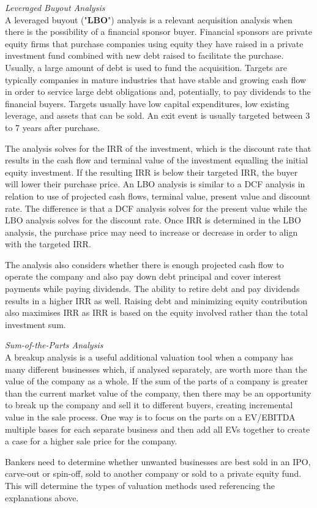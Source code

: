 \documentclass[10pt, a4paper]{article}
\begin{document}
\vspace{10pt}
\noindent \textit{Leveraged Buyout Analysis}\\
A leveraged buyout ("\textbf{LBO}") analysis is a relevant acquisition analysis when there is the possibility of a financial sponsor buyer. Financial sponsors are private equity firms that purchase companies using equity they have raised in a private investment fund combined with new debt raised to facilitate the purchase. Usually, a large amount of debt is used to fund the acquisition. Targets are typically companies in mature industries that have stable and growing cash flow in order to service large debt obligations and, potentially, to pay dividends to the financial buyers. Targets usually have low capital expenditures, low existing leverage, and assets that can be sold. An exit event is usually targeted between 3 to 7 years after purchase.

\vspace{5pt}
\noindent The analysis solves for the IRR of the investment, which is the discount rate that results in the cash flow and terminal value of the investment equalling the initial equity investment. If the resulting IRR is below their targeted IRR, the buyer will lower their purchase price. An LBO analysis is similar to a DCF analysis in relation to use of projected cash flows, terminal value, present value and discount rate. The difference is that a DCF analysis solves for the present value while the LBO analysis solves for the discount rate. Once IRR is determined in the LBO analysis, the purchase price may need to increase or decrease in order to align with the targeted IRR.

\vspace{5pt}
\noindent The analysis also considers whether there is enough projected cash flow to operate the company and also pay down debt principal and cover interest payments while paying dividends. The ability to retire debt and pay dividends results in a higher IRR as well. Raising debt and minimizing equity contribution also maximises IRR as IRR is based on the equity involved rather than the total investment sum.

\vspace{10pt}
\noindent \textit{Sum-of-the-Parts Analysis}\\
A breakup analysis is a useful additional valuation tool when a company has many different businesses which, if analysed separately, are worth more than the value of the company as a whole. If the sum of the parts of a company is greater than the current market value of the company, then there may be an opportunity to break up the company and sell it to different buyers, creating incremental value in the sale process. One way is to focus on the parts on a EV/EBITDA multiple bases for each separate business and then add all EVs together to create a case for a higher sale price for the company.

\vspace{5pt}
\noindent Bankers need to determine whether unwanted businesses are best sold in an IPO, carve-out or spin-off, sold to another company or sold to a private equity fund. This will determine the types of valuation methods used referencing the explanations above.
\end{document}
